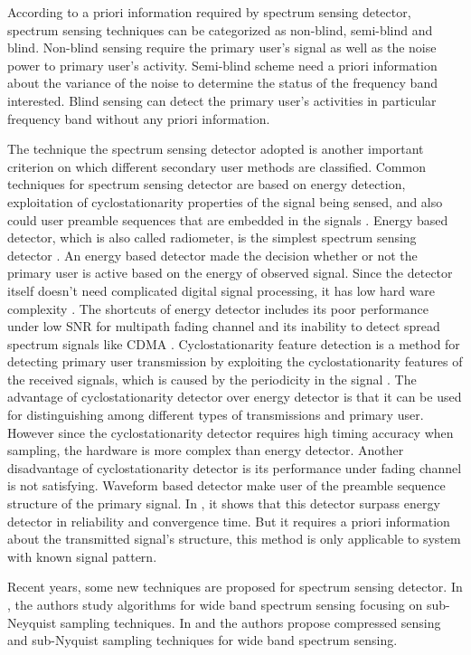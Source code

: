According to a priori information required by spectrum sensing detector, spectrum sensing techniques can be categorized as non-blind, semi-blind and blind. Non-blind sensing require the primary user's signal as well as the noise power to primary user's activity. Semi-blind scheme need a priori information about the variance of the noise to determine the status of the frequency band interested. Blind sensing can detect the primary user's activities in particular frequency band without any priori information. 

The technique the spectrum sensing detector adopted is another important criterion on which different secondary user methods are classified.  
Common techniques for spectrum sensing detector are based on energy detection, exploitation of cyclostationarity properties of the signal being sensed, and also could user preamble sequences that are embedded in the signals \cite{cabric2004implementation}. 
Energy based detector, which is also called radiometer, is the simplest spectrum sensing detector \cite{poor1994introduction}. An energy based detector made the decision whether or not the primary user is active based on the energy of observed signal. 
Since the detector itself doesn't need complicated digital signal processing, it has low hard ware complexity \cite{ma2009signal}. The shortcuts of energy detector includes its poor performance under low SNR for multipath fading channel and its inability to detect spread spectrum signals like CDMA \cite{urkowitz1967energy}. 
Cyclostationarity feature detection is a method for detecting primary user transmission by exploiting the cyclostationarity features of the received signals, which is caused by the periodicity in the signal \cite{goldsmith2009breaking}. The advantage of cyclostationarity detector over energy detector is that it can be used for distinguishing among different types of transmissions and primary user. However since the cyclostationarity detector requires high timing accuracy when sampling, the hardware is more complex than energy detector. Another disadvantage of cyclostationarity detector is its performance under fading channel is not satisfying.   
Waveform based detector make user of the preamble sequence structure of the primary signal. In \cite{tang2005some}, it shows that this detector surpass energy detector in reliability and convergence time. But it requires a priori information about the transmitted signal's structure, this method is only applicable to system with known signal pattern.  

Recent years, some new techniques are proposed for spectrum sensing detector. 
 In \cite{tian2007compressed}, the authors study algorithms for wide band spectrum sensing focusing on sub-Neyquist sampling techniques. In  \cite{sun2013wideband} and  \cite{sun2013wideband2} the authors propose compressed sensing and sub-Nyquist sampling techniques for wide band spectrum sensing.

